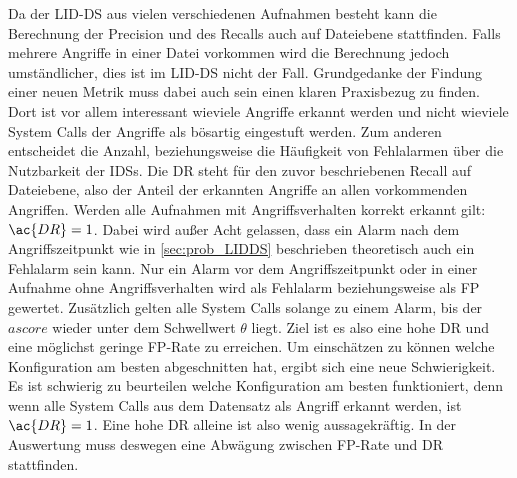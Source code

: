     Da der \ac{LID-DS} aus vielen verschiedenen Aufnahmen besteht kann die Berechnung der Precision und des Recalls auch auf Dateiebene stattfinden.
    Falls mehrere Angriffe in einer Datei vorkommen wird die Berechnung jedoch umständlicher, dies ist im \ac{LID-DS} nicht der Fall.  
    Grundgedanke der Findung einer neuen Metrik muss dabei auch sein einen klaren Praxisbezug zu finden. 
    Dort ist vor allem interessant wieviele Angriffe erkannt werden und nicht wieviele System Calls der Angriffe als bösartig eingestuft werden.
    Zum anderen entscheidet die Anzahl, beziehungsweise die Häufigkeit von Fehlalarmen über die Nutzbarkeit der \acp{IDS}.
    Die \ac{DR} steht für den zuvor beschriebenen Recall auf Dateiebene, also der Anteil der erkannten Angriffe an allen vorkommenden Angriffen.
    Werden alle Aufnahmen mit Angriffsverhalten korrekt erkannt gilt: $\ac{DR}=1$.
    Dabei wird außer Acht gelassen, dass ein Alarm nach dem Angriffszeitpunkt wie in \autoref{sec:prob_LIDDS} beschrieben theoretisch auch ein Fehlalarm sein kann.
    Nur ein Alarm vor dem Angriffszeitpunkt oder in einer Aufnahme ohne Angriffsverhalten wird als Fehlalarm beziehungsweise als \ac{FP} gewertet.
    Zusätzlich gelten alle System Calls solange zu einem Alarm, bis der $ascore$ wieder unter dem Schwellwert $\theta$ liegt.
    Ziel ist es also eine hohe \ac{DR} und eine möglichst geringe \ac{FP}-Rate zu erreichen.
    Um einschätzen zu können welche Konfiguration am besten abgeschnitten hat, ergibt sich eine neue Schwierigkeit.
    Es ist schwierig zu beurteilen welche Konfiguration am besten funktioniert, denn wenn alle System Calls aus dem Datensatz als Angriff erkannt werden, ist $\ac{DR}=1$.
    Eine hohe \ac{DR} alleine ist also wenig aussagekräftig.
    In der Auswertung muss deswegen eine Abwägung zwischen \ac{FP}-Rate und \ac{DR} stattfinden.
